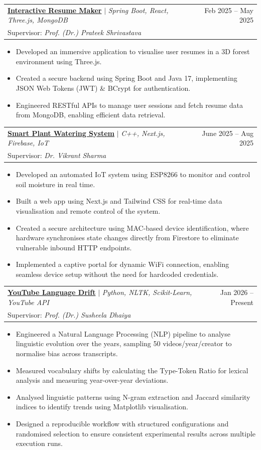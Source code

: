 \documentclass[letterpaper,11pt]{article}
\makeatletter
\newcommand{\resumeItem}[1]{
  \item\small{
    {#1 \vspace{-2pt}}
  }
}
\newcommand{\resumeProjectHeadingGuide}[3]{
    \item
    \begin{tabular*}{0.97\textwidth}{l@{\extracolsep{\fill}}r}
      \small#1 & #2 \\
      \small{Supervisor: \textit{#3}} & \\
    \end{tabular*}\vspace{-7pt}
}
\newcommand{\resumeItemListStart}{\begin{itemize}}
\newcommand{\resumeItemListEnd}{\end{itemize}\vspace{-5pt}}
\makeatother
\begin{document}
      \resumeProjectHeadingGuide
          {\href{https://github.com/190-785/Interactive-Resume-Maker}{\textbf{Interactive Resume Maker}} $|$ \emph{Spring Boot, React, Three.js, MongoDB}}{Feb 2025 -- May 2025}
          {Prof. (Dr.) Prateek Shrivastava}
          \resumeItemListStart
            \resumeItem{Developed an immersive application to visualise user resumes in a 3D forest environment using Three.js.}
            \resumeItem{Created a secure backend using Spring Boot and Java 17, implementing JSON Web Tokens (JWT) \& BCrypt for authentication.}
            \resumeItem{Engineered RESTful APIs to manage user sessions and fetch resume data from MongoDB, enabling efficient data retrieval.}
          \resumeItemListEnd

             \resumeProjectHeadingGuide
          {\href{https://github.com/190-785/Plant_Watering_System}{\textbf{Smart Plant Watering System}} $|$ \emph{C++, Next.js, Firebase, IoT}}{June 2025 -- Aug 2025}
          {Dr. Vikrant Sharma}
          \resumeItemListStart
            \resumeItem{Developed an automated IoT system using ESP8266 to monitor and control soil moisture in real time.}
            \resumeItem{Built a web app using Next.js and Tailwind CSS for real-time data visualisation and remote control of the system.}
            \resumeItem{Created a secure architecture using MAC-based device identification, where hardware synchronises state changes directly from Firestore to eliminate vulnerable inbound HTTP endpoints.}
            \resumeItem{Implemented a captive portal for dynamic WiFi connection, enabling seamless device setup without the need for hardcoded credentials.}
          \resumeItemListEnd
          
      \resumeProjectHeadingGuide
          {\href{https://github.com/190-785/youtube-language-drift}{\textbf{YouTube Language Drift}} $|$ \emph{Python, NLTK, Scikit-Learn, YouTube API}}{Jan 2026 -- Present}
          {Prof. (Dr.) Susheela Dhaiya}
          \resumeItemListStart
            \resumeItem{Engineered a Natural Language Processing (NLP) pipeline to analyse linguistic evolution over the years, sampling 50 videos/year/creator to normalise bias across transcripts. }
            \resumeItem{Measured vocabulary shifts by calculating the Type-Token Ratio for lexical analysis and measuring year-over-year deviations.}
            \resumeItem{Analysed linguistic patterns using N-gram extraction and Jaccard similarity indices to identify trends using Matplotlib visualisation.}
            \resumeItem{Designed a reproducible workflow with structured configurations and randomised selection to ensure consistent experimental results across multiple execution runs.}
          \resumeItemListEnd
          
\end{document}
